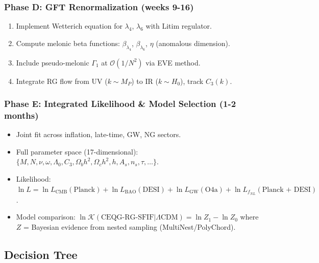 \documentclass[12pt,a4paper]{article}
\begin{document}
\subsubsection{Phase D: GFT Renormalization (weeks 9-16)}

\begin{enumerate}
\item Implement Wetterich equation for \(\lambda_4\), \(\lambda_6\) with Litim regulator.
\item Compute melonic beta functions: \(\beta_{\lambda_4}\), \(\beta_{\lambda_6}\), \(\eta\) (anomalous dimension).
\item Include pseudo-melonic \(\Gamma_1\) at \(\mathcal{O}(1/N^2)\) via EVE method.
\item Integrate RG flow from UV (\(k \sim M_P\)) to IR (\(k \sim H_0\)), track \(C_3(k)\).
\end{enumerate}

\subsubsection{Phase E: Integrated Likelihood \& Model Selection (1-2 months)}

\begin{itemize}
\item Joint fit across inflation, late-time, GW, NG sectors.
\item Full parameter space (17-dimensional): \(\{M, N, \nu, \omega, \Lambda_0, C_3, \Omega_b h^2, \Omega_c h^2, h, A_s, n_s, \tau, \ldots\}\).
\item Likelihood: \(\ln L = \ln L_{\text{CMB}}(\text{Planck}) + \ln L_{\text{BAO}}(\text{DESI}) + \ln L_{\text{GW}}(\text{O4a}) + \ln L_{f_{NL}}(\text{Planck + DESI})\).
\item Model comparison: \(\ln \mathcal{K}(\text{CEQG-RG-SFIF} | \Lambda\text{CDM}) = \ln Z_1 - \ln Z_0\) where \(Z\) = Bayesian evidence from nested sampling (MultiNest/PolyChord).
\end{itemize}

\subsection{Decision Tree}
\end{document}
